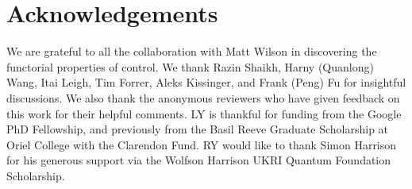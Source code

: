 \section{Acknowledgements}
We are grateful to all the collaboration with Matt Wilson in discovering the functorial properties of control. We thank Razin Shaikh, Harny (Quanlong) Wang, Itai Leigh, Tim Forrer, Aleks Kissinger, and Frank (Peng) Fu for insightful discussions. We also thank the anonymous reviewers who have given feedback on this work for their helpful comments.
LY is thankful for funding from the Google PhD Fellowship, and previously from the Basil Reeve Graduate Scholarship at Oriel College with the Clarendon Fund.
RY would like to thank Simon Harrison for his generous support via the Wolfson Harrison UKRI Quantum Foundation Scholarship.